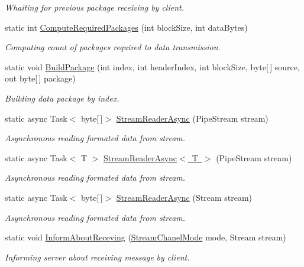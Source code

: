 \begin{DoxyCompactItemize}
\begin{DoxyCompactList}\small\item\em Whaiting for previous package receiving by client. \end{DoxyCompactList}\item 
static int \mbox{\hyperlink{class_uniform_data_operator_1_1_binary_1_1_i_o_1_1_stream_handler_a779f1ec9fe46ac47fe164e51fac29bca}{Compute\+Required\+Packages}} (int block\+Size, int data\+Bytes)
\begin{DoxyCompactList}\small\item\em Computing count of packages required to data transmission. \end{DoxyCompactList}\item 
static void \mbox{\hyperlink{class_uniform_data_operator_1_1_binary_1_1_i_o_1_1_stream_handler_ac3b951b7af74e35d8c01f9986d59abbf}{Build\+Package}} (int index, int header\+Index, int block\+Size, byte\mbox{[}$\,$\mbox{]} source, out byte\mbox{[}$\,$\mbox{]} package)
\begin{DoxyCompactList}\small\item\em Building data package by index. \end{DoxyCompactList}\item 
static async Task$<$ byte\mbox{[}$\,$\mbox{]}$>$ \mbox{\hyperlink{class_uniform_data_operator_1_1_binary_1_1_i_o_1_1_stream_handler_a8953608e9eefaff797f3e4ed49f85bcf}{Stream\+Reader\+Async}} (Pipe\+Stream stream)
\begin{DoxyCompactList}\small\item\em Asynchronous reading formated data from stream. \end{DoxyCompactList}\item 
static async Task$<$ T $>$ \mbox{\hyperlink{class_uniform_data_operator_1_1_binary_1_1_i_o_1_1_stream_handler_ab22ce5f10fb894fff4a675e96917dfbf}{Stream\+Reader\+Async$<$ T $>$}} (Pipe\+Stream stream)
\begin{DoxyCompactList}\small\item\em Asynchronous reading formated data from stream. \end{DoxyCompactList}\item 
static async Task$<$ byte\mbox{[}$\,$\mbox{]}$>$ \mbox{\hyperlink{class_uniform_data_operator_1_1_binary_1_1_i_o_1_1_stream_handler_aa001d58762b89cb8fdaa729b53b2a9af}{Stream\+Reader\+Async}} (Stream stream)
\begin{DoxyCompactList}\small\item\em Asynchronous reading formated data from stream. \end{DoxyCompactList}\item 
static void \mbox{\hyperlink{class_uniform_data_operator_1_1_binary_1_1_i_o_1_1_stream_handler_a3732dec20d216595f8148e91b7aac76a}{Inform\+About\+Receving}} (\mbox{\hyperlink{namespace_uniform_data_operator_1_1_binary_1_1_i_o_a3fee9a9bcba25974554ed63395942161}{Stream\+Chanel\+Mode}} mode, Stream stream)
\begin{DoxyCompactList}\small\item\em Informing server about receiving message by client. \end{DoxyCompactList}\end{DoxyCompactItemize}
